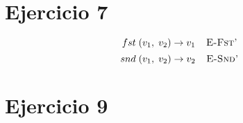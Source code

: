 \documentclass[11pt]{article}
\begin{document}

\section*{Ejercicio 7}


\begin{prooftree}


\end{prooftree}

\begin{prooftree}


\end{prooftree}

\[
    fst \; (v_1, \; v_2) \rightarrow v_1 \; \; \; \; \textsc{E-Fst'}
\]
\[
    snd \; (v_1, \; v_2) \rightarrow v_2 \; \; \; \; \textsc{E-Snd'}
\]

\begin{prooftree}


\end{prooftree}

\begin{prooftree}


\end{prooftree}




\section*{Ejercicio 9}
\end{document}
